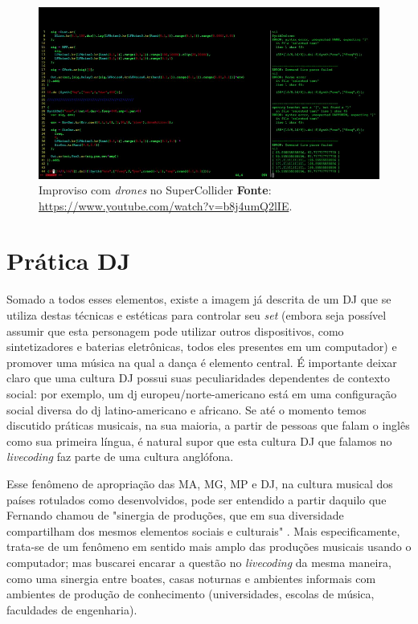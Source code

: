\begin{figure}
\begin{center}
\includegraphics[scale=0.5]{./imagens/sc_drone.png}
\caption{Improviso com \emph{drones} no SuperCollider \textbf{Fonte}: \url{https://www.youtube.com/watch?v=b8j4umQ2lIE}. }
\label{sc_drone}
\end{center}
\end{figure}

\section{Prática DJ}\label{sec:musica_vanguarda_pista}

Somado a todos esses elementos, existe a imagem já descrita de um DJ que se utiliza destas técnicas e estéticas para controlar seu \emph{set} (embora seja possível assumir que esta personagem pode utilizar outros dispositivos, como sintetizadores e baterias eletrônicas, todos eles presentes em um computador) e promover uma música na qual a dança é elemento central. É importante deixar claro que uma cultura DJ possui suas peculiaridades dependentes de contexto social: por exemplo, um dj europeu/norte-americano está em uma configuração social diversa do dj latino-americano e africano. Se até o momento temos discutido práticas musicais, na sua maioria, a partir de pessoas que falam o inglês como sua primeira língua, é natural supor que esta cultura DJ que falamos no \emph{livecoding} faz parte de uma cultura anglófona.

Esse fenômeno de apropriação das MA, MG, MP e DJ, na cultura musical dos países rotulados como desenvolvidos, pode ser entendido a partir daquilo que Fernando   chamou de "sinergia de produções, que em sua diversidade compartilham dos mesmos elementos sociais e culturais" \cite[p.~152]{iazzetta_musica_2009}. Mais especificamente, trata-se de um fenômeno em sentido mais amplo das produções musicais usando o computador; mas buscarei encarar a questão no \emph{livecoding} da mesma maneira, como uma sinergia entre boates, casas noturnas e ambientes informais com ambientes de produção de conhecimento (universidades, escolas de música, faculdades de engenharia).

